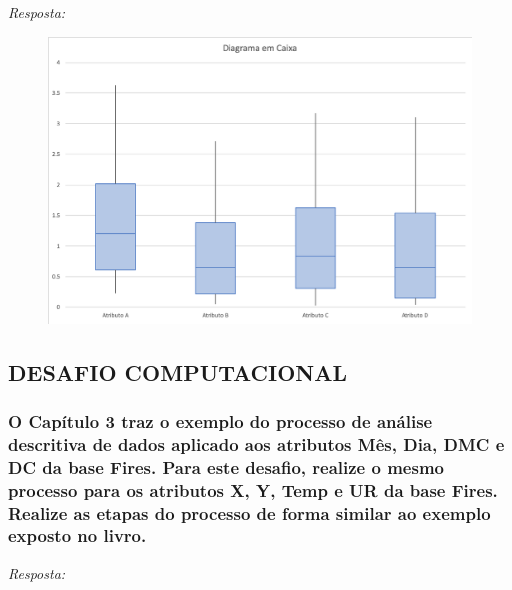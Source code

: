 \documentclass{article}
\begin{document}
\begin{enumerate}[label=\alph*]
  \textit{Resposta:}

  \begin{figure}[H]
    \centering 
    \includegraphics[width=14cm]{grafico_caixa.png} 
  \end{figure}
\end{enumerate}

\subsection{DESAFIO COMPUTACIONAL}
\subsubsection{O Capítulo 3 traz o exemplo do processo de análise descritiva de dados aplicado aos atributos Mês, Dia, DMC e DC da base Fires. Para este desafio, realize o mesmo processo para os atributos X, Y, Temp e UR da base Fires. Realize as etapas do processo de forma similar ao exemplo exposto no livro.}
\textit{Resposta:}
\end{document}
